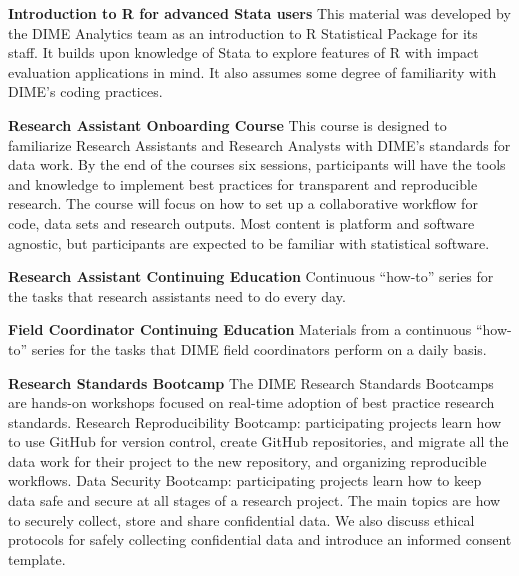 \textbf{Introduction to R for advanced Stata users}
This material was developed by the DIME Analytics team as an introduction to R Statistical Package for its staff. It builds upon knowledge of Stata to explore features of R with impact evaluation applications in mind. It also assumes some degree of familiarity with DIME's coding practices.

\textbf{Research Assistant Onboarding Course}
This course is designed to familiarize Research Assistants and Research Analysts with DIME’s standards for data work. By the end of the courses six sessions, participants will have the tools and knowledge to implement best practices for transparent and reproducible research. The course will focus on how to set up a collaborative workflow for code, data sets and research outputs. Most content is platform and software agnostic, but participants are expected to be familiar with statistical software.

\textbf{Research Assistant Continuing Education}
Continuous “how-to” series for the tasks that research assistants need to do every day.

\textbf{Field Coordinator Continuing Education}
Materials from a continuous “how-to” series for the tasks that DIME field coordinators perform on a daily basis.

\textbf{Research Standards Bootcamp}
The DIME Research Standards Bootcamps are hands-on workshops focused on real-time adoption of best practice research standards. Research Reproducibility Bootcamp: participating projects learn how to use GitHub for version control, create GitHub repositories, and migrate all the data work for their project to the new repository, and organizing reproducible workflows. Data Security Bootcamp: participating projects learn how to keep data safe and secure at all stages of a research project. The main topics are how to securely collect, store and share confidential data. We also discuss ethical protocols for safely collecting confidential data and introduce an informed consent template.


\mainmatter

